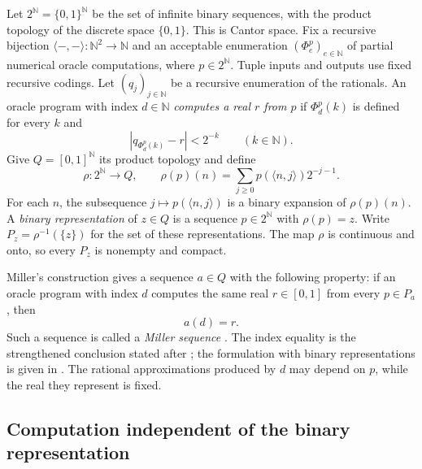 \documentclass[11pt]{article}
\newcommand{\N}{\mathbb N}
\begin{document}
Let $2^{\N}=\{0,1\}^{\N}$ be the set of infinite binary sequences,
with the product topology of the discrete space $\{0,1\}$.
This is Cantor space.
Fix a recursive bijection $\langle-,-\rangle:\N^2\to\N$ and an
acceptable enumeration $(\Phi_e^p)_{e\in\N}$ of partial numerical
oracle computations, where $p\in2^{\N}$. Tuple inputs and outputs use
fixed recursive codings. Let $(q_j)_{j\in\N}$ be a recursive enumeration
of the rationals. An oracle program with index $d\in\N$
\emph{computes a real $r$ from $p$}
if $\Phi_d^p(k)$ is defined for every $k$ and
\[
 |q_{\Phi_d^p(k)}-r|<2^{-k}\qquad(k\in\N).
\]
Give $Q=[0,1]^{\N}$ its product topology and define
\[
 \rho:2^{\N}\longrightarrow Q,\qquad
 \rho(p)(n)=\sum_{j\geq0}p(\langle n,j\rangle)2^{-j-1}.
\]
For each $n$, the subsequence $j\mapsto p(\langle n,j\rangle)$
is a binary expansion of $\rho(p)(n)$.
A \emph{binary representation} of $z\in Q$ is a sequence
$p\in2^{\N}$ with $\rho(p)=z$. Write
$P_z=\rho^{-1}(\{z\})$ for the set of these representations.
The map $\rho$ is continuous and onto, so every $P_z$ is nonempty
and compact.

Miller's construction gives a sequence $a\in Q$ with the following
property: if an oracle program with index $d$ computes the same real $r\in[0,1]$ from
every $p\in P_a$, then
\begin{equation}\label{eq:miller-property}
 a(d)=r.
\end{equation}
Such a sequence is called a \emph{Miller sequence}
\cite[Theorem~2.2]{BauerHanson}.
The index equality is the strengthened conclusion stated after
\cite[Theorem~6.3]{Miller2004}; the formulation with binary
representations is given in
\cite[Section~2.1 and Theorem~2.2]{BauerHanson}.
The rational approximations produced by $d$ may depend on $p$,
while the real they represent is fixed.

\subsection{Computation independent of the binary representation}
\label{sec:miller-category}
\end{document}

